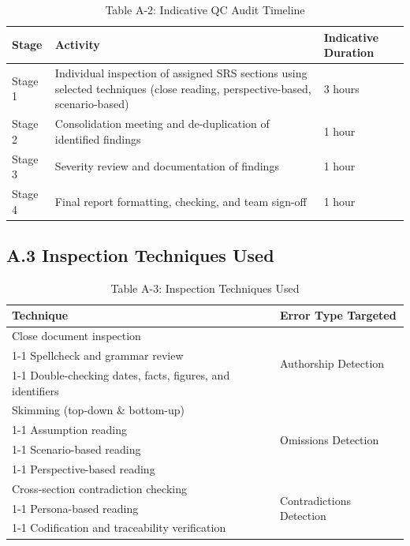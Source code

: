 \documentclass[11pt,a4paper]{article}
\begin{document}
\begin{table}[H]
\centering
\small
\renewcommand{\arraystretch}{1.4}
\begin{tabularx}{\textwidth}{|p{}|p{}|X|}
\hline
\rowcolor{tableheader}
\textbf{Stage} & \textbf{Activity} & \textbf{Indicative Duration} \\
\hline
Stage 1 & Individual inspection of assigned SRS sections using selected techniques (close reading, perspective-based, scenario-based) & 3 hours \\
\hline
Stage 2 & Consolidation meeting and de-duplication of identified findings & 1 hour \\
\hline
Stage 3 & Severity review and documentation of findings & 1 hour \\
\hline
Stage 4 & Final report formatting, checking, and team sign-off & 1 hour \\
\hline
\end{tabularx}
\caption*{Table A-2: Indicative QC Audit Timeline}
\label{tab:qc-timeline}
\end{table}

\subsection*{A.3 Inspection Techniques Used}

\begin{table}[H]
\centering
\small
\renewcommand{\arraystretch}{1.6}
\begin{tabularx}{\textwidth}{|X|p{}|}
\hline
\rowcolor{tableheader}
\textbf{Technique} & \textbf{Error Type Targeted} \\
\hline
Close document inspection & \multirow{3}{*}{Authorship Detection} \\
\cline{1-1}
Spellcheck and grammar review & \\
\cline{1-1}
Double-checking dates, facts, figures, and identifiers & \\
\hline
Skimming (top-down \& bottom-up) & \multirow{4}{*}{Omissions Detection} \\
\cline{1-1}
Assumption reading & \\
\cline{1-1}
Scenario-based reading & \\
\cline{1-1}
Perspective-based reading & \\
\hline
Cross-section contradiction checking & \multirow{3}{*}{Contradictions Detection} \\
\cline{1-1}
Persona-based reading & \\
\cline{1-1}
Codification and traceability verification & \\
\hline
\end{tabularx}
\caption*{Table A-3: Inspection Techniques Used}
\label{tab:qc-techniques}
\end{table}
\end{document}
